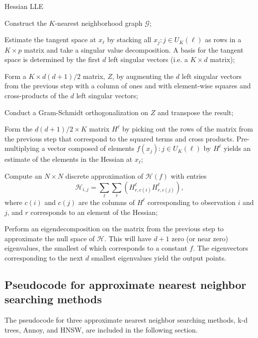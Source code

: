 \documentclass[11pt,a4paper,]{article}
\begin{document}
\begin{algorithm}[!htb]
  \caption{Hessian LLE}
  \label{alg:hlle}
  \begin{algorithmic}[1]

  \STATE Construct the $K$-nearest neighborhood graph $\mathcal{G}$;


  \STATE Estimate the tangent space at $x_\ell$ by stacking all $x_j:j\in U_K(\ell)$ as rows in a $K\times p$ matrix and take a singular value decomposition. A basis for the tangent space is determined by the first $d$ left singular vectors (i.e. a $K\times d$ matrix);

  \STATE Form a $K\times d(d+1)/2$ matrix, $Z$, by augmenting the $d$ left singular vectors from the previous step with a column of ones and with element-wise squares and cross-products of the $d$ left singular vectors;

  \STATE Conduct a Gram-Schmidt orthogonalization on $Z$ and transpose the result;

  \STATE Form the $d(d+1)/2\times K$ matrix $H^\ell$ by picking out the rows of the matrix from the previous step that correspond to the squared terms and cross products. Pre-multiplying a vector composed of elements $f(x_j):j\in U_K(\ell)$ by $H^\ell$ yields an estimate of the elements in the Hessian at $x_\ell$;

  \ENDFOR

  \STATE Compute an $N\times N$ discrete approximation of $\mathcal{H}(f)$ with entries
  $$
    \mathcal{H}_{i,j} = \sum_\ell \sum_r (H^\ell_{r,c(i)} H^\ell_{r,c(j)}),
  $$
  where $c(i)$ and $c(j)$ are the columns of $H^\ell$ corresponding to observation $i$ and $j$, and $r$ corresponds to an element of the Hessian;

  \STATE  Perform an eigendecomposition on the matrix from the previous step to approximate the null space of $\mathcal{H}$. This will have $d+1$ zero (or near zero) eigenvalues, the smallest of which corresponds to a constant $f$. The eigenvectors corresponding to the next $d$ smallest eigenvalues yield the output points.

  \end{algorithmic}
\end{algorithm}

\clearpage
\FloatBarrier

\subsection{Pseudocode for approximate nearest neighbor searching methods}
\label{sec:annalg}
The pseudocode for three approximate nearest neighbor searching methods, k-d trees, Annoy, and HNSW, are included in the following section.
\end{document}
